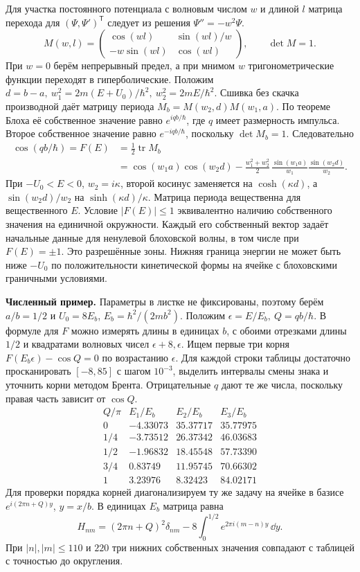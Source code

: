 \documentclass[11pt,a4paper]{article}
\begin{document}
Для участка постоянного потенциала с волновым числом \(w\)
и длиной \(l\) матрица перехода для
\((\Psi,\Psi')^{\mathsf T}\) следует из решения \(\Psi''=-w^2\Psi\).
\[
 M(w,l)=
 \begin{pmatrix}
 \cos(wl)&\sin(wl)/w\\ -w\sin(wl)&\cos(wl)
 \end{pmatrix},\qquad \det M=1.
\]
При \(w=0\) берём непрерывный предел, а при мнимом \(w\)
тригонометрические функции переходят в гиперболические.
Положим \(d=b-a,\ w_1^2=2m(E+U_0)/\hbar^2,\ w_2^2=2mE/\hbar^2\).
Сшивка без скачка производной даёт матрицу периода
\(M_b=M(w_2,d)M(w_1,a)\). По теореме Блоха её собственное
значение равно \(e^{iqb/\hbar}\), где \(q\) имеет размерность
импульса. Второе собственное значение равно \(e^{-iqb/\hbar}\),
поскольку \(\det M_b=1\). Следовательно
\begin{align*}
 \cos(qb/\hbar)=F(E)
 &=\tfrac12\operatorname{tr}M_b\\
 &=\cos(w_1a)\cos(w_2d)
   -\frac{w_1^2+w_2^2}{2}\,
     \frac{\sin(w_1a)}{w_1}\frac{\sin(w_2d)}{w_2}.
\end{align*}
При \(-U_0<E<0\), \(w_2=i\kappa\), второй косинус заменяется
на \(\cosh(\kappa d)\), а \(\sin(w_2d)/w_2\) на
\(\sinh(\kappa d)/\kappa\).
Матрица периода вещественна для вещественного \(E\).
Условие \(|F(E)|\le1\) эквивалентно наличию собственного значения
на единичной окружности. Каждый его собственный вектор задаёт
начальные данные для ненулевой блоховской волны, в том числе
при \(F(E)=\pm1\). Это разрешённые зоны. Нижняя граница энергии
не может быть ниже \(-U_0\) по положительности кинетической формы
на ячейке с блоховскими граничными условиями.

\textbf{Численный пример.}
Параметры в листке не фиксированы, поэтому берём \(a/b=1/2\) и
\(U_0=8E_b\), \(E_b=\hbar^2/(2mb^2)\).
Положим \(\epsilon=E/E_b,\ Q=qb/\hbar\). В формуле для \(F\)
можно измерять длины в единицах \(b\), с обоими отрезками
длины \(1/2\) и квадратами волновых чисел \(\epsilon+8,\epsilon\).
Ищем первые три корня \(F(E_b\epsilon)-\cos Q=0\) по возрастанию
\(\epsilon\). Для каждой строки таблицы достаточно просканировать
\([-8,85]\) с шагом \(10^{-3}\), выделить интервалы смены знака и
уточнить корни методом Брента. Отрицательные \(q\) дают те же
числа, поскольку правая часть зависит от \(\cos Q\).
\[
 \begin{array}{c|rrr}
 Q/\pi & E_1/E_b & E_2/E_b & E_3/E_b\\ \hline
 0   &-4.33073 &35.37717 &35.77975\\
 1/4 &-3.73512 &26.37342 &46.03683\\
 1/2 &-1.96832 &18.45548 &57.73390\\
 3/4 & 0.83749 &11.95745 &70.66302\\
 1   & 3.23976 & 8.32423 &84.02171
 \end{array}
\]
Для проверки порядка корней диагонализируем ту же задачу
на ячейке в базисе \(e^{i(2\pi n+Q)y}\), \(y=x/b\).
В единицах \(E_b\) матрица равна
\[
 H_{nm}=(2\pi n+Q)^2\delta_{nm}
            -8\int_0^{1/2}e^{2\pi i(m-n)y}\,\dd y .
\]
При \(|n|,|m|\le110\) и \(220\) три нижних собственных значения
совпадают с таблицей с точностью до округления.
\end{document}
